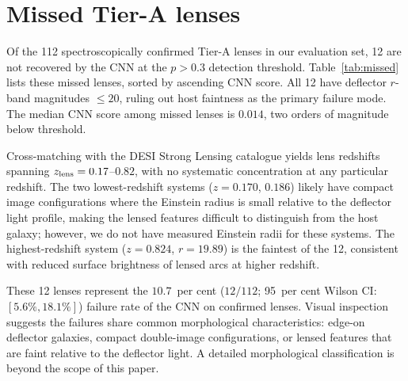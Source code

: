 \documentclass[fleqn,usenatbib]{mnras}
\begin{document}
\section{Missed Tier-A lenses}
\label{app:missed}

Of the 112 spectroscopically confirmed Tier-A lenses in our evaluation set, 12 are not recovered by the CNN at the $p > 0.3$ detection threshold.  Table~\ref{tab:missed} lists these missed lenses, sorted by ascending CNN score.  All 12 have deflector $r$-band magnitudes $\leq 20$, ruling out host faintness as the primary failure mode.  The median CNN score among missed lenses is $0.014$, two orders of magnitude below threshold.

Cross-matching with the DESI Strong Lensing catalogue yields lens redshifts spanning $z_{\rm lens} = 0.17$--$0.82$, with no systematic concentration at any particular redshift.  The two lowest-redshift systems ($z = 0.170$, $0.186$) likely have compact image configurations where the Einstein radius is small relative to the deflector light profile, making the lensed features difficult to distinguish from the host galaxy; however, we do not have measured Einstein radii for these systems.  The highest-redshift system ($z = 0.824$, $r = 19.89$) is the faintest of the 12, consistent with reduced surface brightness of lensed arcs at higher redshift.

These 12 lenses represent the $10.7$~per cent ($12/112$; 95~per cent Wilson CI: $[5.6\%, 18.1\%]$) failure rate of the CNN on confirmed lenses.  Visual inspection suggests the failures share common morphological characteristics: edge-on deflector galaxies, compact double-image configurations, or lensed features that are faint relative to the deflector light.  A detailed morphological classification is beyond the scope of this paper.
\end{document}
